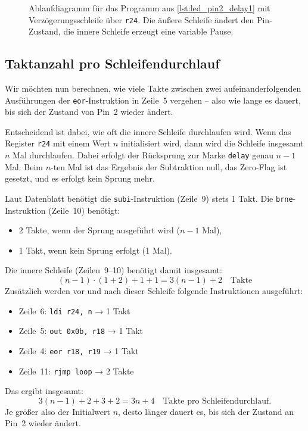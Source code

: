 \documentclass[a4paper,12pt]{article}
\begin{document}
\begin{figure}[htbp]
\begin{center}
{
}
\end{center}
\caption{
    Ablaufdiagramm für das Programm aus \autoref{lst:led_pin2_delay1} mit
    Verzögerungsschleife über \texttt{r24}. Die äußere Schleife ändert den
    Pin-Zustand, die innere Schleife erzeugt eine variable Pause.
}
\label{fig:delay1}
\end{figure}

\subsection{Taktanzahl pro Schleifendurchlauf}

Wir möchten nun berechnen, wie viele Takte zwischen zwei aufeinanderfolgenden
Ausführungen der \texttt{eor}-Instruktion in Zeile~5 vergehen – also wie lange
es dauert, bis sich der Zustand von Pin~2 wieder ändert.

Entscheidend ist dabei, wie oft die innere Schleife durchlaufen wird. Wenn das
Register \texttt{r24} mit einem Wert \( n \) initialisiert wird, dann wird die
Schleife insgesamt \( n \) Mal durchlaufen. Dabei erfolgt der Rücksprung zur
Marke \texttt{delay} genau \( n-1 \) Mal. Beim \( n \)-ten Mal ist das Ergebnis
der Subtraktion null, das Zero-Flag ist gesetzt, und es erfolgt kein Sprung
mehr.

\noindent
Laut Datenblatt benötigt die \texttt{subi}-Instruktion (Zeile~9) stets 1
Takt.  Die \texttt{brne}-Instruktion (Zeile~10) benötigt:
\begin{itemize}
  \item 2 Takte, wenn der Sprung ausgeführt wird (\( n-1 \) Mal),
  \item 1 Takt, wenn kein Sprung erfolgt (1 Mal).
\end{itemize}
Die innere Schleife (Zeilen~9–10) benötigt damit insgesamt:
\[
(n-1) \cdot (1 + 2) + 1 + 1 = 3(n-1) + 2 \quad \text{Takte}
\]
Zusätzlich werden vor und nach dieser Schleife folgende Instruktionen
ausgeführt:
\begin{itemize}
  \item Zeile~6: \texttt{ldi r24, n} → 1 Takt
  \item Zeile~5: \texttt{out 0x0b, r18} → 1 Takt
  \item Zeile~4: \texttt{eor r18, r19} → 1 Takt
  \item Zeile~11: \texttt{rjmp loop} → 2 Takte
\end{itemize}
Das ergibt insgesamt:
\[
3(n-1) + 2 + 3 + 2 = 3n + 4 \quad \text{Takte pro Schleifendurchlauf.}
\]
Je größer also der Initialwert \( n \), desto länger dauert es, bis sich der
Zustand an Pin~2 wieder ändert.
\end{document}
